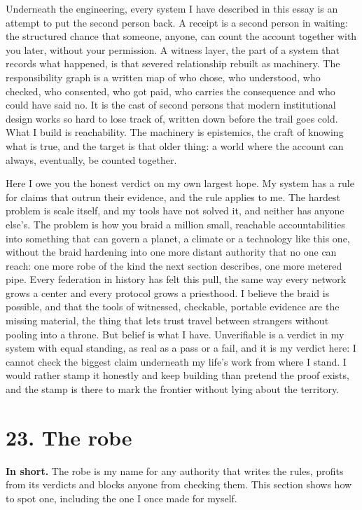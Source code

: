 \documentclass[11pt]{article}
\begin{document}
Underneath the engineering, every system I have described in this essay is an attempt to put the second person back. A receipt is a second person in waiting: the structured chance that someone, anyone, can count the account together with you later, without your permission. A witness layer, the part of a system that records what happened, is that severed relationship rebuilt as machinery. The responsibility graph is a written map of who chose, who understood, who checked, who consented, who got paid, who carries the consequence and who could have said no. It is the cast of second persons that modern institutional design works so hard to lose track of, written down before the trail goes cold. What I build is reachability. The machinery is epistemics, the craft of knowing what is true, and the target is that older thing: a world where the account can always, eventually, be counted together.

Here I owe you the honest verdict on my own largest hope. My system has a rule for claims that outrun their evidence, and the rule applies to me. The hardest problem is scale itself, and my tools have not solved it, and neither has anyone else's. The problem is how you braid a million small, reachable accountabilities into something that can govern a planet, a climate or a technology like this one, without the braid hardening into one more distant authority that no one can reach: one more robe of the kind the next section describes, one more metered pipe. Every federation in history has felt this pull, the same way every network grows a center and every protocol grows a priesthood. I believe the braid is possible, and that the tools of witnessed, checkable, portable evidence are the missing material, the thing that lets trust travel between strangers without pooling into a throne. But belief is what I have. Unverifiable is a verdict in my system with equal standing, as real as a pass or a fail, and it is my verdict here: I cannot check the biggest claim underneath my life's work from where I stand. I would rather stamp it honestly and keep building than pretend the proof exists, and the stamp is there to mark the frontier without lying about the territory.

\section*{23. The robe}

\textbf{In short.} The robe is my name for any authority that writes the rules, profits from its verdicts and blocks anyone from checking them. This section shows how to spot one, including the one I once made for myself.
\end{document}
